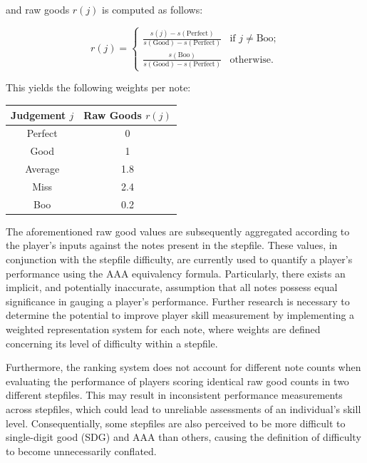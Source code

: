 and raw goods $r(j)$ is computed as follows:

\begin{equation*}
	r(j) = 
	\begin{cases}
		\displaystyle \frac{s(j) - s(\text{Perfect})}{s(\text{Good}) - s(\text{Perfect})}
		  &   
		\text{if $j \neq \text{Boo}$;}
		\\[10pt]
		\displaystyle \frac{s(\text{Boo})}{s(\text{Good}) - s(\text{Perfect})}
		  &   
		\text{otherwise.}
	\end{cases}
\end{equation*}

This yields the following weights per note:

\begin{center}
	\begin{tabular}{c@{\hskip 5mm}c}
		\hspace{5mm} \textbf{Judgement} $j$ \hspace{5mm} & \textbf{Raw Goods} $r(j)$ \\
            \hline
		Perfect                               & 0                         \\
		Good                                  & 1                         \\
		Average                               & 1.8                       \\
		Miss                                  & 2.4                       \\
		Boo                                   & 0.2                       \\
	\end{tabular}
\end{center}

The aforementioned raw good values are subsequently aggregated according to the player's inputs against the notes present in the stepfile. These values, in conjunction with the stepfile difficulty, are currently used to quantify a player's performance using the AAA equivalency formula. Particularly, there exists an implicit, and potentially inaccurate, assumption that all notes possess equal significance in gauging a player's performance. Further research is necessary to determine the potential to improve player skill measurement by implementing a weighted representation system for each note, where weights are defined concerning its level of difficulty within a stepfile. 

\vspace{2mm}

Furthermore, the ranking system does not account for different note counts when evaluating the performance of players scoring identical raw good counts in two different stepfiles. This may result in inconsistent performance measurements across stepfiles, which could lead to unreliable assessments of an individual's skill level. Consequentially, some stepfiles are also perceived to be more difficult to single-digit good (SDG) and AAA than others, causing the definition of difficulty to become unnecessarily conflated.

